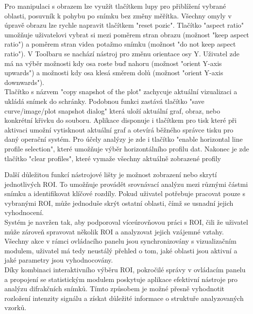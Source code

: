 \documentclass{article}
\begin{document}
Pro manipulaci s obrazem lze využít tlačítkem lupy pro přiblížení vybrané oblasti, posuvník k pohybu po snímku bez změny měřítka. Všechny omyly v úpravě obrazu lze rychle napravit tlačítkem "reset pozic". Tlačítko "aspect ratio" umožňuje uživatelovi vybrat si mezi poměrem stran obrazu (možnost "keep aspect  ratio") a poměrem stran videa potažmo snímku (možnost "do not keep aspect ratio"). V Toolbaru se nachází nástroj pro změnu orientace osy Y. Uživatel zde má na výběr možnosti kdy osa roste buď nahoru (možnost "orient Y-axis upwards") a možnosti kdy osa klesá směrem dolů (možnost "orient Y-axis downwards").\\

Tlačítko s názvem "copy snapshot of the plot" zachycuje aktuální vizualizaci a ukládá snímek do schránky. Podobnou funkci zastává tlačítko "save curve/image/plot snapshot dialog" která uloží aktuální graf, obraz, nebo konkrétní křivku do souboru. Aplikace disponuje i tlačítkem pro tisk které při aktivaci umožní vytisknout aktuální graf a otevírá běžného správce tisku pro daný operační systém. Pro účely analýzy je zde i tlačítko "enable horizontal line profile selection", které umožňuje výběr horizontálního profilu dat. Nakonec je zde tlačítko "clear profiles", které vymaže všechny aktuálně zobrazené profily

Další důležitou funkcí nástrojové lišty je možnost zobrazení nebo skrytí jednotlivých ROI. To umožňuje provádět srovnávací analýzu mezi různými částmi snímku a identifikovat klíčové rozdíly. Pokud uživatel potřebuje pracovat pouze s vybranými ROI, může jednoduše skrýt ostatní oblasti, čímž se usnadní jejich vyhodnocení.\\

Systém je navržen tak, aby podporoval víceúrovňovou práci s ROI, čili že uživatel může zároveň spravovat několik ROI a analyzovat jejich vzájemné vztahy. Všechny akce v rámci ovládacího panelu jsou synchronizovány s vizualizačním modulem, uživatel má tedy neustálý přehled o tom, jaké oblasti jsou aktivní a jaké parametry jsou vyhodnocovány.\\

Díky kombinaci interaktivního výběru ROI, pokročilé správy v ovládacím panelu a propojení se statistickým modulem poskytuje aplikace efektivní nástroje pro analýzu difrakčních snímků. Tímto způsobem je možné přesně vyhodnotit rozložení intenzity signálu a získat důležité informace o struktuře analyzovaných vzorků.\\
\end{document}
